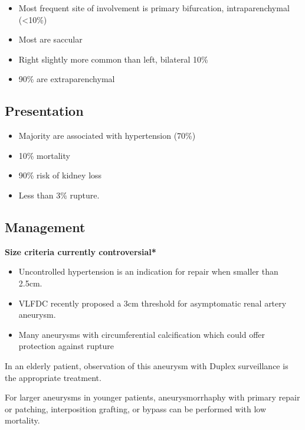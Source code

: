 \documentclass[
]{book}
\begin{document}
\begin{itemize}
\item
  Most frequent site of involvement is primary bifurcation,
  intraparenchymal (\textless10\%)
\item
  Most are saccular
\item
  Right slightly more common than left, bilateral 10\%
\item
  90\% are extraparenchymal
\end{itemize}

\hypertarget{presentation-10}{%
\subsection{Presentation}\label{presentation-10}}

\begin{itemize}
\item
  Majority are associated with hypertension (70\%)
  \citep{colemanRenalArteryAneurysms2015}
\item
  10\% mortality
\item
  90\% risk of kidney loss
\item
  Less than 3\% rupture.
\end{itemize}

\hypertarget{management-25}{%
\subsection{Management}\label{management-25}}

\textbf{Size criteria currently controversial*}

\begin{itemize}
\item
  Uncontrolled hypertension is an indication for repair when smaller
  than 2.5cm. \citep{colemanRenalArteryAneurysms2015}
\item
  VLFDC recently proposed a 3cm threshold for asymptomatic renal
  artery aneurysm. \citep{klausnerContemporaryManagementRenal2015}
\item
  Many aneurysms with circumferential calcification which could offer
  protection against rupture
\end{itemize}

In an elderly patient, observation of this aneurysm with Duplex
surveillance is the appropriate treatment.

For larger aneurysms in younger patients, aneurysmorrhaphy with primary
repair or patching, interposition grafting, or bypass can be performed
with low mortality. \citep{colemanRenalArteryAneurysms2015}
\end{document}

